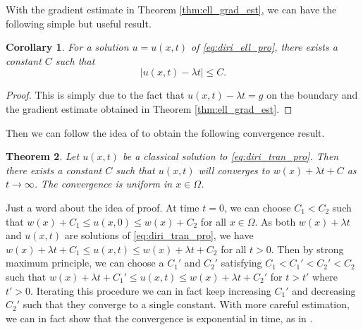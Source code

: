 \documentclass[12pt]{article}
\numberwithin{equation}{section}
\theoremstyle{plain}
\newtheorem{theorem}{Theorem}[section]
\newtheorem{corollary}[theorem]{Corollary}
\theoremstyle{definition}
\theoremstyle{remark}
\begin{document}
With the gradient estimate in Theorem \ref{thm:ell_grad_est}, we can have the following simple but useful result.
\begin{corollary}
For a solution $u=u(x,t)$ of \eqref{eq:diri_ell_pro}, there exists a constant $C$ such that
\begin{equation}
    |u(x,t)-\lambda t| \leq C.
\end{equation}   
\end{corollary}
\begin{proof}
    This is simply due to the fact that $u(x,t)-\lambda t = g$ on the boundary and the gradient estimate obtained in Theorem \ref{thm:ell_grad_est}.
\end{proof}
Then we can follow the idea of \cite[Theorem 4.6]{DKY} to obtain the following
convergence result.
\begin{theorem}
Let $u(x,t)$ be a classical solution to \eqref{eq:diri_tran_pro}. Then there exists a constant $C$ such that $u(x,t)$ will converges to $w(x) + \lambda t + C$ as $t\longrightarrow \infty$. The convergence is uniform in $x\in\Omega$.
\end{theorem}

Just a word about the idea of proof. At time $t=0$, we can choose $C_1 < C_2$ such that
$w(x) + C_1 \leq u(x,0) \leq w(x) + C_2$ for all $x\in\Omega$. As both $w(x) + \lambda t$ and $u(x,t)$ are solutions of \eqref{eq:diri_tran_pro}, we have
$w(x) + \lambda t + C_1 \leq u(x,t) \leq w(x) + \lambda t + C_2$ for all $t > 0$.
Then by strong maximum principle, we can choose a $C_1'$ and $C_2'$ satisfying
$C_1 < C_1' < C_2' < C_2$ such that 
$w(x) + \lambda t + C_1' \leq u(x,t) \leq w(x) + \lambda t + C_2'$ for $t > t'$
where $t' > 0$. Iterating this procedure we can in fact keep increasing $C_1'$ and decreasing $C_2'$ such that they converge to a single constant. With more careful estimation, we can in fact show that the convergence is exponential in time, as in
\cite[Theorem 4.6]{DKY}.





\end{document}
